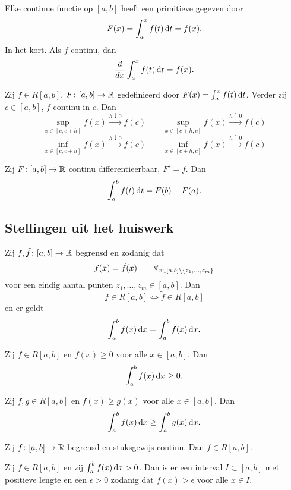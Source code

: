 \documentclass{2wa40summary}
\begin{document}
			\begin{gevolg}
				Elke continue functie op $ [a,b] $ heeft een primitieve gegeven door 
				\[ 
					F(x)= \int_a^x f(t)\mathop{}\!\mathrm{d} t = f(x).
				 \]
				 In het kort. Als $f$ continu, dan 
				 \[ 
					 \frac{d}{dx} \int_a^x f(t)\mathop{}\!\mathrm{d} t = f(x).
				  \]
			\end{gevolg}
			
			\begin{lemma}
				Zij $ f \in R[a,b] $, $F\colon [a,b] \to \mathbb{R}$ gedefinieerd door $ F(x) = \int_a^x f(t)\mathop{}\!\mathrm{d} t $. Verder zij $ c \in [a,b] $, $f$ continu in $c$. Dan
				\[ 
					\sup_{x \in [c,c+h]} f(x) \xrightarrow{h \downarrow 0} f(c)
					\qquad
					\sup_{x \in [c+h,c]} f(x) \xrightarrow{h \uparrow 0} f(c)
				 \]
				 \[ 
					\inf_{x \in [c,c+h]} f(x) \xrightarrow{h \downarrow 0} f(c)
					\qquad
					\inf_{x \in [c+h,c]} f(x) \xrightarrow{h \uparrow 0} f(c)
				  \]
			\end{lemma}
			
			\begin{theorem}
				Zij $ F\colon [a,b] \to \mathbb{R} $ continu differentieerbaar, $ F'=f $. Dan
				\[ 
					\int_a^b f(t)\mathop{}\!\mathrm{d} t = F(b)-F(a).
				 \]
			\end{theorem}
			
		\subsection{Stellingen uit het huiswerk}
			\begin{theorem}
				Zij $ f, \tilde f \colon [a,b] \to \mathbb{R} $ begrensd en zodanig dat 
				\[ 
					f(x) = \tilde f(x) \qquad \forall_{x \in [a,b] \backslash\lbrace z_1, \ldots, z_m\rbrace}
				 \]
				 voor een eindig aantal punten $ z_1, \ldots, z_m \in [a,b] $. Dan
				 \[ 
					 f \in R[a,b] \iff \tilde f \in R[a,b]
				  \]
				  en er geldt
				  \[ 
					  \int_a^b f(x)\mathop{}\!\mathrm{d} x = \int_a^b \tilde f(x)\mathop{}\!\mathrm{d} x.
				   \]
			\end{theorem}
			\begin{theorem}
				Zij $f \in R[a,b]$ en $f(x) \ge 0$ voor alle $x \in [a,b]$. Dan 
				\[ 
					\int_a^b f(x)\mathop{}\!\mathrm{d} x \ge 0.
				 \]
			\end{theorem}
			\begin{theorem}
				Zij $f,g \in R[a,b]$ en $f(x) \ge g(x)$ voor alle $x \in [a,b]$. Dan
				\[ 
					\int_a^b f(x)\mathop{}\!\mathrm{d} x \ge \int_a^b g(x)\mathop{}\!\mathrm{d} x.
				 \]
			\end{theorem}
			\begin{theorem}
				Zij $f\colon [a,b] \to \mathbb{R}$ begrensd en stuksgewijs continu. Dan $f\in R[a,b]$.
			\end{theorem}
			\begin{theorem}
				Zij $f \in R[a,b]$ en zij $\int_a^b f(x) \mathop{}\!\mathrm{d} x >0$. Dan is er een interval $I \subset [a,b]$ met positieve lengte en een $\epsilon >0$ zodanig dat $f(x) > \epsilon$ voor alle $x \in I$.
			\end{theorem}
		
\end{document}

